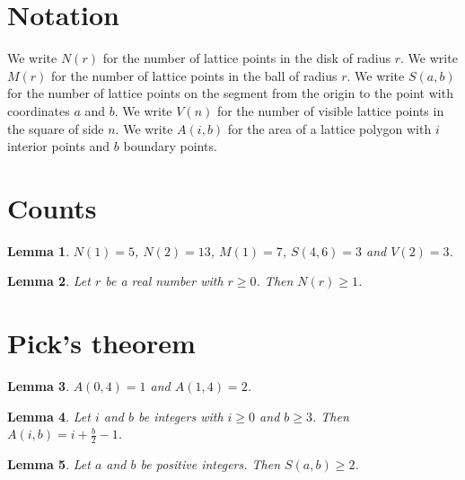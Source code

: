 \documentclass{article}
\newtheorem{lemma}{Lemma}
\begin{document}
\section{Notation}

We write $N(r)$ for the number of lattice points in the disk of radius $r$.
We write $M(r)$ for the number of lattice points in the ball of radius $r$.
We write $S(a,b)$ for the number of lattice points on the segment from the origin to the point with coordinates $a$ and $b$.
We write $V(n)$ for the number of visible lattice points in the square of side $n$.
We write $A(i,b)$ for the area of a lattice polygon with $i$ interior points and $b$ boundary points.

\section{Counts}

\begin{lemma}\label{counts}
$N(1)=5$, $N(2)=13$, $M(1)=7$, $S(4,6)=3$ and $V(2)=3$.
\end{lemma}

\begin{lemma}\label{origin}
Let $r$ be a real number with $r\ge0$. Then $N(r)\ge1$.
\end{lemma}

\section{Pick's theorem}

\begin{lemma}\label{pick}
$A(0,4)=1$ and $A(1,4)=2$.
\end{lemma}

\begin{lemma}\label{pick-general}
Let $i$ and $b$ be integers with $i\ge0$ and $b\ge3$. Then $A(i,b)=i+\frac{b}{2}-1$.
\end{lemma}

\begin{lemma}\label{segment}
Let $a$ and $b$ be positive integers. Then $S(a,b)\ge2$.
\end{lemma}
\end{document}
